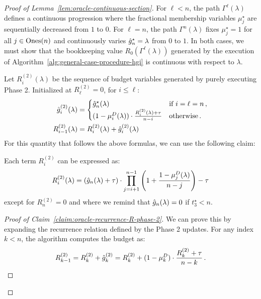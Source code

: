 \begin{proof}[Proof of Lemma~\ref{lem:oracle-continuous-section}]
    For $\ell < n$, the path $\Gamma^\ell(\lambda)$ defines a continuous progression where the fractional membership variables $\mu_j^\star$ are sequentially decreased from $1$ to $0$.
    For $\ell = n$, the path $\Gamma^n(\lambda)$ fixes $\mu_j^\star = 1$ for all $j \in \text{Ones}(n)$ and continuously varies $\hat{g}_n^\star = \lambda$ from $0$ to $1$.
    In both cases, we must show that the bookkeeping value $R_0(\Gamma^\ell(\lambda))$ generated by the execution of Algorithm~\ref{alg:general-case-procedure-hgi} is continuous with respect to $\lambda$.

    Let $R_i^{(2)}(\lambda)$ be the sequence of budget variables generated by purely executing Phase 2.
    Initialized at $R_{\ell}^{(2)} = 0$, for $i \le \ell$:
    \begin{align*}
        \hat{g}_i^{(2)}(\lambda) &= \begin{cases}
            \hat{g}_n^\star(\lambda) & \text{if } i = \ell = n\,, \\
            (1 - \mu_i^D(\lambda)) \cdot \frac{R_i^{(2)}(\lambda) + \tau}{n - i} & \text{otherwise}\,.
        \end{cases} \\
        R_{i-1}^{(2)}(\lambda) &= R_i^{(2)}(\lambda) + \hat{g}_i^{(2)}(\lambda)
    \end{align*}
    For this quantity that follows the above formulas, we can use the following claim:
    \begin{claim}\label{claim:oracle-recurrence-R-phase-2}
        Each term $R_i^{(2)}$ can be expressed as:
        \begin{equation*}
            R_{i}^{(2)}(\lambda) = (\hat{g}_n(\lambda) +\tau)\cdot\prod_{j=i+1}^{n-1}\left(1+\frac{1-\mu_j^D(\lambda)}{n-j}\right) - \tau
        \end{equation*}
        except for $R_n^{(2)}=0$ and where we remind that $\hat{g}_n(\lambda)=0$ if $t_3^\star<n$.
    \end{claim}
    \begin{proof}[Proof of Claim~\ref{claim:oracle-recurrence-R-phase-2}]
        We can prove this by expanding the recurrence relation defined by the Phase 2 updates. For any index $k < n$, the algorithm computes the budget as:
        \begin{equation*}
            R_{k-1}^{(2)} = R_k^{(2)} + \hat{g}_k^{(2)} = R_k^{(2)} + (1 - \mu_k^D) \cdot \frac{R_k^{(2)} + \tau}{n - k}\,.
        \end{equation*}

\end{proof}
\end{proof}
